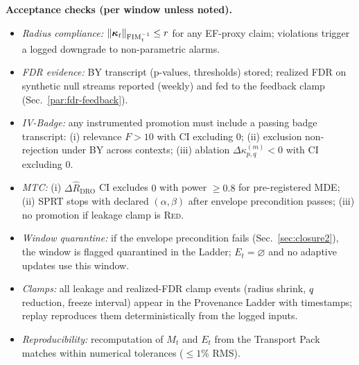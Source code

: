 \begin{mdframed}
\textbf{Acceptance checks (per window unless noted).}
\begin{itemize}[leftmargin=*]
\item \emph{Radius compliance:} $\|\bm\kappa_t\|_{\mathrm{FIM}_t^{-1}}\le r$ for any EF-proxy claim; violations trigger a logged downgrade to non-parametric alarms.
\item \emph{FDR evidence:} BY transcript (p-values, thresholds) stored; realized FDR on synthetic null streams reported (weekly) and fed to the feedback clamp (Sec.~\ref{par:fdr-feedback}).
\item \emph{IV-Badge:} any instrumented promotion must include a passing badge transcript: (i) relevance $F>10$ with CI excluding $0$; (ii) exclusion non-rejection under BY across contexts; (iii) ablation $\Delta\kappa_{p,q}^{(m)}<0$ with CI excluding $0$.
\item \emph{MTC:} (i) $\Delta\hat R_{\mathrm{DRO}}$ CI excludes $0$ with power $\ge 0.8$ for pre-registered MDE; (ii) SPRT stops with declared $(\alpha,\beta)$ after envelope precondition passes; (iii) no promotion if leakage clamp is \textsc{Red}.
\item \emph{Window quarantine:} if the envelope precondition fails (Sec.~\ref{sec:closure2}), the window is flagged \textsf{quarantined} in the Ladder; $E_t=\varnothing$ and no adaptive updates use this window.
\item \emph{Clamps:} all leakage and realized-FDR clamp events (radius shrink, $q$ reduction, freeze interval) appear in the Provenance Ladder with timestamps; replay reproduces them deterministically from the logged inputs.
\item \emph{Reproducibility:} recomputation of $M_t$ and $E_t$ from the Transport Pack matches within numerical tolerances ($\le 1\%$ RMS).
\end{itemize}
\end{mdframed}
